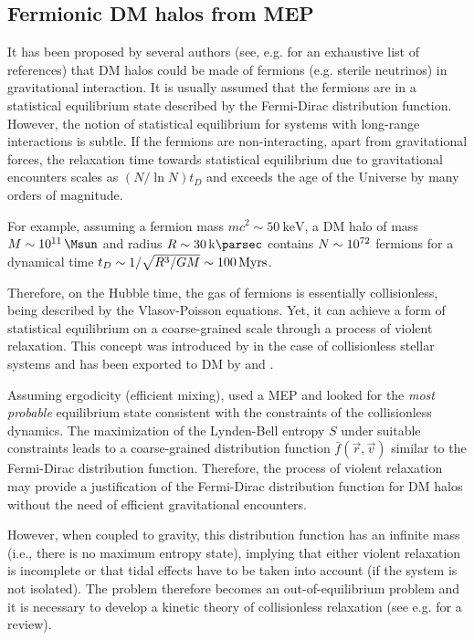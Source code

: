 \subsection{Fermionic DM halos from MEP}
\label{sec:model:rar}

It has been proposed by several authors (see, e.g. \citealp{2020EPJP..135..290C} for an exhaustive list of references) that DM halos could be made of fermions (e.g. sterile neutrinos) in gravitational interaction. It is usually assumed that the fermions are in a statistical equilibrium state described by the Fermi-Dirac distribution function. However, the notion of statistical equilibrium for systems with long-range interactions is subtle. If the fermions are non-interacting, apart from gravitational forces, the relaxation time towards statistical equilibrium due to gravitational encounters scales as $(N/\ln N)t_D$ \citep[see e.g.][]{Binney2008} and exceeds the age of the Universe by many orders of magnitude.

For example, assuming a fermion mass $m c^2 \sim \SI{50}{\kilo\eV}$, a DM halo of mass $M\sim \SI{E11}{\Msun}$ and radius $R \sim \SI{30}{\kilo\parsec}$ contains $N\sim \num{E72}$ fermions for a dynamical time $t_D\sim 1/\sqrt{R^3/G M}\sim 100\, {\rm Myrs}$.

Therefore, on the Hubble time, the gas of fermions is essentially collisionless, being described by the Vlasov-Poisson equations. Yet, it can achieve a form of statistical equilibrium on a coarse-grained scale through a process of violent relaxation. This concept was introduced  by \cite{1967MNRAS.136..101L} in the case of collisionless stellar systems and has been exported to DM by \citet{1996ApJ...466L...1K} and \citet{2015PhRvD..92l3527C}. 

Assuming ergodicity (efficient mixing), \citet{1967MNRAS.136..101L} used a MEP and looked for the {\it most probable} equilibrium state consistent with the constraints of the collisionless dynamics. The maximization of the Lynden-Bell entropy $S$ under suitable constraints leads to a coarse-grained distribution function $\bar{f}({\vec r},{\vec v})$ similar to the Fermi-Dirac distribution function. Therefore, the process of violent relaxation may provide a justification of the Fermi-Dirac distribution function for DM halos without the need of efficient gravitational encounters.

However, when coupled to gravity, this distribution function has an infinite mass (i.e., there is no maximum entropy state), implying that either violent relaxation is incomplete or that tidal effects have to be taken into account (if the system is not isolated). The problem therefore becomes an out-of-equilibrium problem and it is necessary to develop a kinetic theory of collisionless relaxation (see e.g. \citealp{2021arXiv211213664C} for a review).

